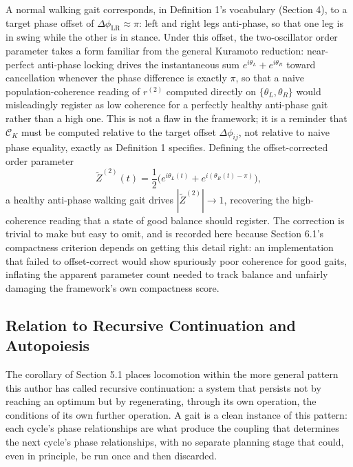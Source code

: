 \documentclass[12pt]{article}
\begin{document}
A normal walking gait corresponds, in Definition 1's vocabulary (Section 4), to a target phase offset of $\Delta\phi_{\text{LR}} \approx \pi$: left and right legs anti-phase, so that one leg is in swing while the other is in stance. Under this offset, the two-oscillator order parameter takes a form familiar from the general Kuramoto reduction: near-perfect anti-phase locking drives the instantaneous sum $e^{i\theta_L} + e^{i\theta_R}$ toward cancellation whenever the phase difference is exactly $\pi$, so that a naive population-coherence reading of $r^{(2)}$ computed directly on $\{\theta_L, \theta_R\}$ would misleadingly register as low coherence for a perfectly healthy anti-phase gait rather than a high one. This is not a flaw in the framework; it is a reminder that $\mathcal{C}_K$ must be computed relative to the target offset $\Delta\phi_{ij}$, not relative to naive phase equality, exactly as Definition 1 specifies. Defining the offset-corrected order parameter
\[
\tilde Z^{(2)}(t) = \frac{1}{2}\Big(e^{i\theta_L(t)} + e^{i(\theta_R(t) - \pi)}\Big),
\]
a healthy anti-phase walking gait drives $|\tilde Z^{(2)}| \to 1$, recovering the high-coherence reading that a state of good balance should register. The correction is trivial to make but easy to omit, and is recorded here because Section 6.1's compactness criterion depends on getting this detail right: an implementation that failed to offset-correct would show spuriously poor coherence for good gaits, inflating the apparent parameter count needed to track balance and unfairly damaging the framework's own compactness score.

\subsection{Relation to Recursive Continuation and Autopoiesis}

The corollary of Section 5.1 places locomotion within the more general pattern this author has called recursive continuation: a system that persists not by reaching an optimum but by regenerating, through its own operation, the conditions of its own further operation. A gait is a clean instance of this pattern: each cycle's phase relationships are what produce the coupling that determines the next cycle's phase relationships, with no separate planning stage that could, even in principle, be run once and then discarded.
\end{document}
